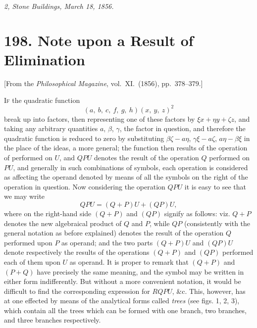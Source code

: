 \documentclass[12pt,a4paper]{article}
\theoremstyle{definition}
\begin{document}
\bigskip

\noindent\textit{2, Stone Buildings, March 18, 1856.}

\newpage


\section*{198. Note upon a Result of Elimination}

\begin{center}
[From the \textit{Philosophical Magazine}, vol.~XI.~(1856), pp.~378--379.]
\end{center}

\bigskip

I\textsc{f} the quadratic function
\[
(a,\ b,\ c,\ f,\ g,\ h)(x,\ y,\ z)^2
\]
break up into factors, then representing one of these factors by $\xi x + \eta y + \zeta z$, and taking
any arbitrary quantities $a$, $\beta$, $\gamma$, the factor in question, and therefore the quadratic
function is reduced to zero by substituting $\beta\zeta - a\eta$, $\gamma\xi - a\zeta$, $a\eta - \beta\xi$ in the place of
the ideas, a more general; the function then results of the operation of performed on
$U$, and $QPU$ denotes the result of the operation $Q$ performed on $PU$, and generally
in such combinations of symbols, each operation is considered as affecting the operand
denoted by means of all the symbols on the right of the operation in question. Now
considering the operation $QPU$ it is easy to see that we may write
\[
QPU = (Q + P)U + (QP)U,
\]
where on the right-hand side $(Q + P)$ and $(QP)$ signify as follows: viz. $Q + P$ denotes
the new algebraical product of $Q$ and $P$, while $QP$ (consistently with the general
notation as before explained) denotes the result of the operation $Q$ performed upon
$P$ as operand; and the two parts $(Q + P)U$ and $(QP)U$ denote respectively the
results of the operations $(Q + P)$ and $(QP)$ performed each of them upon $U$ as operand.
It is proper to remark that $(Q + P)$ and $(P+Q)$ have precisely the same meaning,
and the symbol may be written in either form indifferently. But without a more
convenient notation, it would be difficult to find the corresponding expression for
$RQPU$, \&c. This, however, has at one effected by means of the analytical forms
called \textit{trees} (see figs. 1, 2, 3), which contain all the trees which can be formed with
one branch, two branches, and three branches respectively.

\medskip
\end{document}
